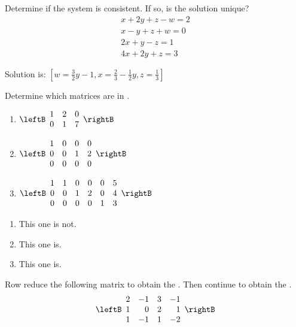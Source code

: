 \begin{enumialphparenastyle}
\begin{ex}
Determine if the system is consistent. If so, is the solution unique? 
\begin{equation*}
\begin{array}{c}
x+2y+z-w=2 \\
x-y+z+w=0 \\
2x+y-z=1 \\
4x+2y+z=3
\end{array}
\end{equation*}
\begin{sol}
Solution is: $\left[ w=\frac{3}{2}y-1,x=\frac{2}{3}-\frac{1}{2}y,z=\frac{1}{3
}\right] $
\end{sol}
\end{ex}

\begin{ex} Determine which matrices are in \rref. 

\begin{enumerate}
\item $\leftB
\begin{array}{rrr}
1 & 2 & 0 \\
0 & 1 & 7
\end{array}
\rightB $

\item $\leftB
\begin{array}{rrrr}
1 & 0 & 0 & 0 \\
0 & 0 & 1 & 2 \\
0 & 0 & 0 & 0
\end{array}
\rightB $

\item $\leftB
\begin{array}{rrrrrr}
1 & 1 & 0 & 0 & 0 & 5 \\
0 & 0 & 1 & 2 & 0 & 4 \\
0 & 0 & 0 & 0 & 1 & 3
\end{array}
\rightB $
\end{enumerate}
\begin{sol}
\begin{enumerate}
\item This one is not.
\item This one is.
\item This one is.
\end{enumerate}
\end{sol}
\end{ex}

\begin{ex} Row reduce the following matrix to obtain the \ef. Then continue to obtain the \rref. 
\begin{equation*}
\leftB
\begin{array}{rrrr}
2 & -1 & 3 & -1 \\
1 & 0 & 2 & 1 \\
1 & -1 & 1 & -2
\end{array}
\rightB
\end{equation*}
\end{ex}


\end{enumialphparenastyle}

